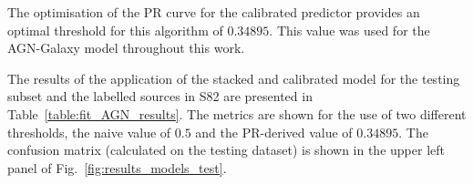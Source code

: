 \documentclass{aa}
\begin{document}
\begin{table}
  \setlength{\tabcolsep}{2pt}
  \caption{Best performing models for the AGN-galaxy classification}             %
  \label{table:fit_AGN_models}      %
  \centering                          %
  \end{table}

The optimisation of the PR curve for the calibrated predictor provides an optimal threshold for this algorithm of $0.34895$. This value was used for the AGN-Galaxy model throughout this work.

The results of the application of the stacked and calibrated model for the testing subset and the labelled sources in S82 are presented in Table~\ref{table:fit_AGN_results}. The metrics are shown for the use of two different thresholds, the naive value of $0.5$ and the  PR-derived value of $0.34895$. The confusion matrix (calculated on the testing dataset) is shown in the upper left panel of Fig.~\ref{fig:results_models_test}. 
\end{document}
